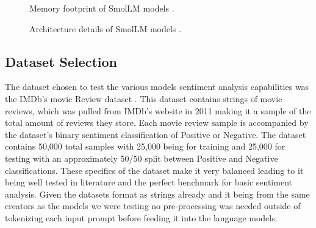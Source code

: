 \documentclass[10pt,twocolumn,letterpaper]{article}
\begin{document}
\begin{figure}[t]
\begin{center}
\end{center}
   \caption{Memory footprint of SmolLM models \cite{hf-smollm-usecase}.}
\label{fig:smollm-memory}
\end{figure}


\begin{figure}[t]
\begin{center}
\end{center}
   \caption{Architecture details of SmolLM models \cite{hf-smollm-usecase}.}
\label{fig:smollm-parameteres}
\end{figure}


\subsection{Dataset Selection}
The dataset chosen to test the various models sentiment analysis capabilities was the IMDb's movie Review dataset \cite{IMDB-dataset}. This dataset contains strings of movie reviews, which was pulled from IMDb's website in 2011 making it a sample of the total amount of reviews they store. Each movie review sample is accompanied by the dataset's binary sentiment classification of Positive or Negative. The dataset contains 50,000 total samples with 25,000 being for training and 25,000 for testing with an approximately 50/50 split between Positive and Negative classifications. These specifics of the dataset make it very balanced leading to it being well tested in literature and the perfect benchmark for basic sentiment analysis. Given the datasets format as strings already and it being from the same creators as the models we were testing no pre-processing was needed outside of tokenizing each input prompt before feeding it into the language models. 
\end{document}
